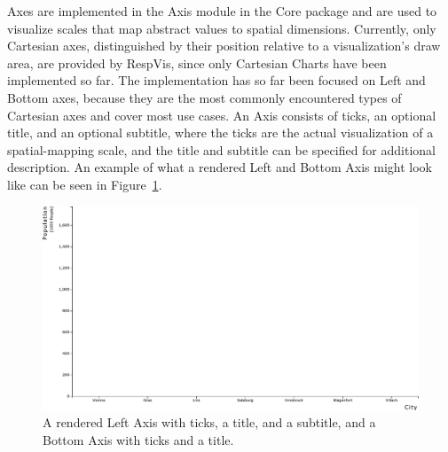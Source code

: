 Axes are implemented in the  Axis module in
the Core package and are used to visualize scales that map
abstract values to spatial dimensions. Currently, only Cartesian axes,
distinguished by their position relative to a visualization's draw
area, are provided by RespVis, since only Cartesian Charts have been
implemented so far. The implementation has so far been focused on Left
and Bottom axes, because they are the most commonly encountered types
of Cartesian axes and cover most use cases. An Axis consists
of ticks, an optional title, and an optional subtitle, where the ticks
are the actual visualization of a spatial-mapping scale, and the title
and subtitle can be specified for additional description. An example
of what a rendered Left and Bottom Axis might look like can
be seen in Figure~\ref{fig:Axes}.

\begin{figure}[tp]
\centering
\includegraphics[keepaspectratio,width=\linewidth,height=\fullh]
{diagrams/axes.pdf}
\caption[Axes Example]{%
A rendered Left Axis with ticks, a title, and a subtitle, and a
Bottom Axis with ticks and a title.
}
\label{fig:Axes}
\end{figure}


